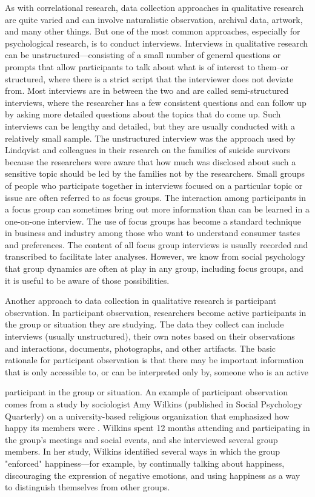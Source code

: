 As with correlational research, data collection approaches in qualitative research are quite varied and can involve naturalistic observation, archival data, artwork, and many other things. But one of the most common approaches, especially for psychological research, is to conduct interviews. Interviews in qualitative research can be unstructured---consisting of a small number of general questions or prompts that allow participants to talk about what is of interest to them–or structured, where there is a strict script that the interviewer does not deviate from. Most interviews are in between the two and are called semi-structured interviews, where the researcher has a few consistent questions and can follow up by asking more detailed questions about the topics that do come up. Such interviews can be lengthy and detailed, but they are usually conducted with a relatively small sample. The unstructured interview was the approach used by Lindqvist and colleagues in their research on the families of suicide survivors because the researchers were aware that how much was disclosed about such a sensitive topic should be led by the families not by the researchers. Small groups of people who participate together in interviews focused on a particular topic or issue are often referred to as focus groups. The interaction among participants in a focus group can sometimes bring out more information than can be learned in a one-on-one interview. The use of focus groups has become a standard technique in business and industry among those who want to understand consumer tastes and preferences. The content of all focus group interviews is usually recorded and transcribed to facilitate later analyses. However, we know from social psychology that group dynamics are often at play in any group, including focus groups, and it is useful to be aware of those possibilities.

Another approach to data collection in qualitative research is participant observation. In participant observation, researchers become active participants in the group or situation they are studying. The data they collect can include interviews (usually unstructured), their own notes based on their observations and interactions, documents, photographs, and other artifacts. The basic rationale for participant observation is that there may be important information that is only accessible to, or can be interpreted only by, someone who is an active

participant in the group or situation. An example of participant observation comes from a study by sociologist Amy Wilkins (published in Social Psychology Quarterly) on a university-based religious organization that emphasized how happy its members were \citep{wilkins_happier_2008}. Wilkins spent 12 months attending and participating in the group's meetings and social events, and she interviewed several group members. In her study, Wilkins identified several ways in which the group "enforced" happiness---for example, by continually talking about happiness, discouraging the expression of negative emotions, and using happiness as a way to distinguish themselves from other groups.

